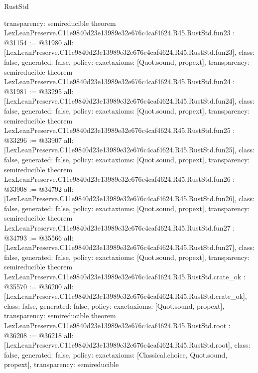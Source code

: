 \begin{lexlean}{RustStd}
\begin{coremodule}
{  transparency: semireducible
}
theorem LexLeanPreserve.C11e9840d23e13989e32e676c4caf4624.R45.RustStd.fun23 : @31154 := @31980 {
  all: [LexLeanPreserve.C11e9840d23e13989e32e676c4caf4624.R45.RustStd.fun23],
  class: false,
  generated: false,
  policy: exact{axioms: [Quot.sound, propext]},
  transparency: semireducible
}
theorem LexLeanPreserve.C11e9840d23e13989e32e676c4caf4624.R45.RustStd.fun24 : @31981 := @33295 {
  all: [LexLeanPreserve.C11e9840d23e13989e32e676c4caf4624.R45.RustStd.fun24],
  class: false,
  generated: false,
  policy: exact{axioms: [Quot.sound, propext]},
  transparency: semireducible
}
theorem LexLeanPreserve.C11e9840d23e13989e32e676c4caf4624.R45.RustStd.fun25 : @33296 := @33907 {
  all: [LexLeanPreserve.C11e9840d23e13989e32e676c4caf4624.R45.RustStd.fun25],
  class: false,
  generated: false,
  policy: exact{axioms: [Quot.sound, propext]},
  transparency: semireducible
}
theorem LexLeanPreserve.C11e9840d23e13989e32e676c4caf4624.R45.RustStd.fun26 : @33908 := @34792 {
  all: [LexLeanPreserve.C11e9840d23e13989e32e676c4caf4624.R45.RustStd.fun26],
  class: false,
  generated: false,
  policy: exact{axioms: [Quot.sound, propext]},
  transparency: semireducible
}
theorem LexLeanPreserve.C11e9840d23e13989e32e676c4caf4624.R45.RustStd.fun27 : @34793 := @35566 {
  all: [LexLeanPreserve.C11e9840d23e13989e32e676c4caf4624.R45.RustStd.fun27],
  class: false,
  generated: false,
  policy: exact{axioms: [Quot.sound, propext]},
  transparency: semireducible
}
theorem LexLeanPreserve.C11e9840d23e13989e32e676c4caf4624.R45.RustStd.crate_ok : @35570 := @36200 {
  all: [LexLeanPreserve.C11e9840d23e13989e32e676c4caf4624.R45.RustStd.crate_ok],
  class: false,
  generated: false,
  policy: exact{axioms: [Quot.sound, propext]},
  transparency: semireducible
}
theorem LexLeanPreserve.C11e9840d23e13989e32e676c4caf4624.R45.RustStd.root : @36208 := @36218 {
  all: [LexLeanPreserve.C11e9840d23e13989e32e676c4caf4624.R45.RustStd.root],
  class: false,
  generated: false,
  policy: exact{axioms: [Classical.choice, Quot.sound, propext]},
  transparency: semireducible
}


\end{coremodule}
\end{lexlean}
